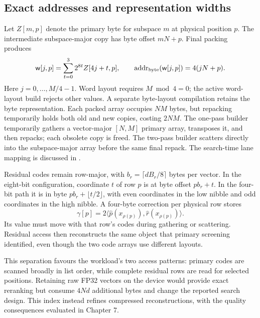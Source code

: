 \subsection{Exact addresses and representation widths}

Let $Z[m,p]$ denote the primary byte for subspace $m$ at physical
position $p$. The intermediate subspace-major copy has byte offset
$mN+p$. Final packing produces
\begin{equation}
 \mathsf w[j,p]=\sum_{t=0}^{3}2^{8t}Z[4j+t,p],\qquad
 \operatorname{addr}_{\rm byte}(\mathsf w[j,p])=4(jN+p).
 \label{eq:4-primary-address}
\end{equation}
Here $j=0,\ldots,M/4-1$. Word layout requires $M\bmod4=0$; the active
word-layout build rejects other values. A separate byte-layout compilation
retains the byte representation. Each packed array occupies $NM$ bytes,
but repacking temporarily holds both old and new copies, costing $2NM$.
The one-pass builder
temporarily gathers a vector-major $[N,M]$ primary array, transposes it, and
then repacks; each obsolete copy is freed. The two-pass builder scatters
directly into the subspace-major array before the same final repack.
The search-time lane mapping is discussed in .

Residual codes remain row-major, with
$b_r=\lceil dB_r/8\rceil$ bytes per vector. In the eight-bit configuration,
coordinate $t$ of row $p$ is at byte offset $pb_r+t$. In the four-bit
path it is in byte $pb_r+\lfloor t/2\rfloor$, with even coordinates
in the low nibble and odd coordinates in the high nibble. A four-byte
correction per physical row stores
\begin{equation}
 \gamma[ p ]=2\langle\widehat p(x_{\rho(p)}),
                              \widehat r(x_{\rho(p)})\rangle.
 \label{eq:4-correction}
\end{equation}
Its value must move with that row's codes during gathering or scattering.
Residual access then reconstructs the same object that primary screening
identified, even though the two code arrays use different layouts.

This separation favours the workload's two access patterns: primary codes
are scanned broadly in list order, while complete residual rows are read
for selected positions. Retaining raw FP32 vectors on the device would
provide exact reranking but consume $4Nd$ additional bytes and change the
reported search design. This index instead refines compressed
reconstructions, with the quality consequences evaluated in Chapter 7.
